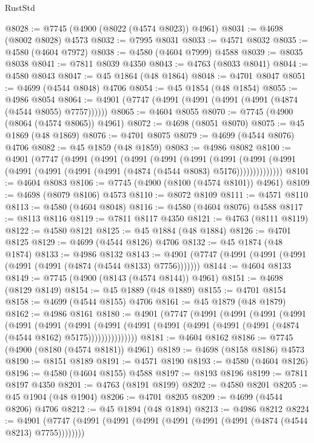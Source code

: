 \begin{lexlean}{RustStd}
\begin{coremodule}
@8028 := @7745 (@4900 (@8022 (@4574 @8023)) @4961)
@8031 := @4698 (@8002 @8028) @4573
@8032 := @7995 @8031
@8033 := @4571 @8032
@8035 := @4580 (@4604 @7972)
@8038 := @4580 (@4604 @7999) @4588
@8039 := @8035 @8038
@8041 := @7811 @8039 @4350
@8043 := @4763 (@8033 @8041)
@8044 := @4580 @8043
@8047 := @45 @1864 (@48 @1864)
@8048 := @4701 @8047
@8051 := @4699 (@4544 @8048) @4706
@8054 := @45 @1854 (@48 @1854)
@8055 := @4986 @8054
@8064 := @4901 (@7747 (@4991 (@4991 (@4991 (@4991 (@4874 (@4544 @8055) @7757))))))
@8065 := @4604 @8055
@8070 := @7745 (@4900 (@8064 (@4574 @8065)) @4961)
@8072 := @4698 (@8051 @8070)
@8075 := @45 @1869 (@48 @1869)
@8076 := @4701 @8075
@8079 := @4699 (@4544 @8076) @4706
@8082 := @45 @1859 (@48 @1859)
@8083 := @4986 @8082
@8100 := @4901
    (@7747
      (@4991
        (@4991
          (@4991
            (@4991
              (@4991
                (@4991
                  (@4991 (@4991 (@4991 (@4991 (@4991 (@4991 (@4874 (@4544 @8083) @5176))))))))))))))
@8101 := @4604 @8083
@8106 := @7745 (@4900 (@8100 (@4574 @8101)) @4961)
@8109 := @4698 (@8079 @8106) @4573
@8110 := @8072 @8109
@8111 := @4571 @8110
@8113 := @4580 (@4604 @8048)
@8116 := @4580 (@4604 @8076) @4588
@8117 := @8113 @8116
@8119 := @7811 @8117 @4350
@8121 := @4763 (@8111 @8119)
@8122 := @4580 @8121
@8125 := @45 @1884 (@48 @1884)
@8126 := @4701 @8125
@8129 := @4699 (@4544 @8126) @4706
@8132 := @45 @1874 (@48 @1874)
@8133 := @4986 @8132
@8143 := @4901 (@7747 (@4991 (@4991 (@4991 (@4991 (@4991 (@4874 (@4544 @8133) @7756)))))))
@8144 := @4604 @8133
@8149 := @7745 (@4900 (@8143 (@4574 @8144)) @4961)
@8151 := @4698 (@8129 @8149)
@8154 := @45 @1889 (@48 @1889)
@8155 := @4701 @8154
@8158 := @4699 (@4544 @8155) @4706
@8161 := @45 @1879 (@48 @1879)
@8162 := @4986 @8161
@8180 := @4901
    (@7747
      (@4991
        (@4991
          (@4991
            (@4991
              (@4991
                (@4991
                  (@4991
                    (@4991
                      (@4991 (@4991 (@4991 (@4991 (@4991 (@4874 (@4544 @8162) @5175)))))))))))))))
@8181 := @4604 @8162
@8186 := @7745 (@4900 (@8180 (@4574 @8181)) @4961)
@8189 := @4698 (@8158 @8186) @4573
@8190 := @8151 @8189
@8191 := @4571 @8190
@8193 := @4580 (@4604 @8126)
@8196 := @4580 (@4604 @8155) @4588
@8197 := @8193 @8196
@8199 := @7811 @8197 @4350
@8201 := @4763 (@8191 @8199)
@8202 := @4580 @8201
@8205 := @45 @1904 (@48 @1904)
@8206 := @4701 @8205
@8209 := @4699 (@4544 @8206) @4706
@8212 := @45 @1894 (@48 @1894)
@8213 := @4986 @8212
@8224 := @4901 (@7747 (@4991 (@4991 (@4991 (@4991 (@4991 (@4991 (@4874 (@4544 @8213) @7755))))))))

\end{coremodule}
\end{lexlean}
